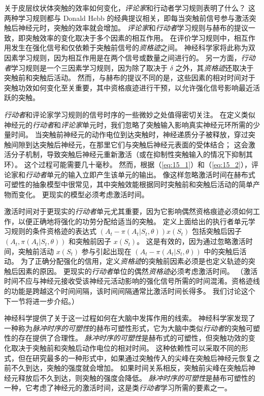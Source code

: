 关于皮层纹状体突触的效率如何变化，\textit{评论家}和行动者学习规则表明了什么？
这两种学习规则都与 Donald Hebb 的经典提议相关，即每当突触前信号参与激活突触后神经元时，突触的效率就会增加\cite{hebb2005organization}。
\textit{评论家}和\textit{行动者}学习规则与赫布的提议一致，即突触效率的变化取决于多个因素的相互作用。
在评价学习规则中，相互作用发生在强化信号和仅依赖于突触前信号的\textit{资格迹}之间。
神经科学家将此称为双因素学习规则，因为相互作用是在两个信号或数量之间进行的。
另一方面，\textit{行动者}学习规则是一个三因素学习规则，因为除了取决于 $\delta$ 之外，其\textit{资格迹}还取决于突触前和突触后活动。
然而，与赫布的提议不同的是，这些因素的相对时间对于突触功效如何变化至关重要，其中资格痕迹进行干预，以允许强化信号影响最近活跃的突触。


\textit{行动者}和评论家学习规则的信号时序的一些微妙之处值得密切关注。
在定义类似神经元的\textit{行动者}和\textit{评论家}单元时，我们忽略了突触输入影响真实神经元环所需的少量时间。
当突触前神经元的动作电位到达突触时，神经递质分子被释放，穿过突触间隙到达突触后神经元，在那里它们与突触后神经元表面的受体结合；
这会激活分子机制，导致突触后神经元重新激活（或在抑制性突触输入的情况下抑制其环）。
这个过程可能需要几十毫秒。
然而，根据（\ref{eq:15_1}）和（\ref{eq:15_2}），评论家和\textit{行动者}单元的输入立即产生该单元的输出。
像这样忽略激活时间在赫布式可塑性的抽象模型中很常见，其中突触效能根据同时突触前和突触后活动的简单产物而变化。
更现实的模型必须考虑激活时间。


激活时间对于更现实的\textit{行动者}单元尤其重要，因为它影响偶然资格痕迹必须如何工作，以便正确地将强化的功劳分配给适当的突触。
定义上面给出的执行者单元学习规则的条件资格迹的表达式 $(A_t - \pi(A_t|S_t, \theta)) x(S_t)$ 包括突触后因子 $(A_t, \pi(A_t | S_t, \theta))$ 和突触前因子 $x(S_t)$。
这是有效的，因为通过忽略激活时间，突触前活动 $x(S_t)$ 参与引起出现在 $(A_t - \pi(A_t | S_t, \theta))$ 中的突触后活动。
为了正确分配强化的信用，定义\textit{资格迹}的突触前因素必须是也定义轨迹的突触后因素的原因。
更现实的\textit{行动者}单位的偶然\textit{资格迹}必须考虑激活时间。
（激活时间不应与神经元接收受该神经元活动影响的强化信号所需的时间混淆。资格迹线的功能是跨越这个时间间隔，该时间间隔通常比激活时间长得多。
我们讨论这个下一节将进一步介绍。）


神经科学提供了关于这一过程如何在大脑中发挥作用的线索。
神经科学家发现了一种称为\textit{脉冲时序的可塑性}的赫布可塑性形式，它为大脑中类似\textit{行动者}的突触可塑性的存在提供了合理性。
\textit{脉冲时序的可塑性}是赫布式的可塑性，但突触功效的变化取决于突触前和突触后动作电位的相对时间。
这种依赖性可以采取不同的形式，但在研究最多的一种形式中，如果通过突触传入的尖峰在突触后神经元恢复之前不久到达，突触的强度就会增加。
如果时间关系相反，突触前尖峰在突触后神经元释放后不久到达，则突触的强度会降低。
\textit{脉冲时序的可塑性}是赫布可塑性的一种，它考虑了神经元的激活时间，这是类\textit{行动者}学习所需的要素之一。


